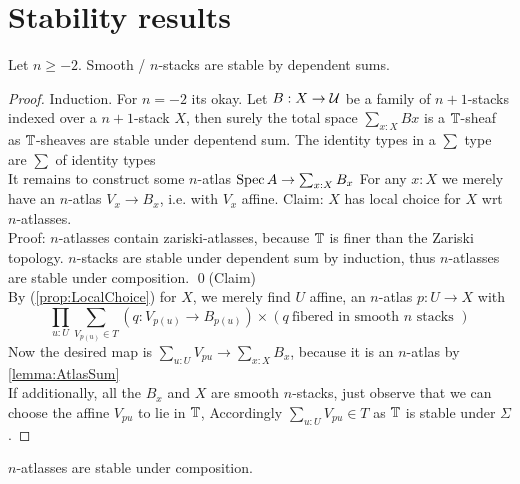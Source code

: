 \documentclass{article}
\begin{document}
\section{Stability results}
\begin{theorem}{\label{thm:stabSums}}
    Let $n \ge -2$. Smooth /  $n$-stacks are stable by dependent sums.
\end{theorem}
\begin{proof}
    Induction.
    For $n = -2$ its okay.    
    Let $B : X \to \mathcal{U}$ be a family of  $n+1$-stacks indexed over a  $n+1$-stack $X$, then surely the total space $\sum_{x : X} B x$ is a $\mathbb{T}$-sheaf as $\mathbb{T}$-sheaves are stable under depentend sum. 
    The identity types in a $\sum$ type are $\sum$ of identity types 
    \\ %
    It remains to construct some $n$-atlas $\operatorname{Spec} A \to \sum_{x : X} B_x$ %
    For any $x : X$ we merely have an $n$-atlas $V_x \to B_x$, i.e. with $V_x$ affine. %
    Claim: $X$ has local choice for $X$ wrt  $n$-atlasses.\\
    Proof:
        $n$-atlasses contain zariski-atlasses, because $\mathbb{T}$ is finer than the Zariski topology.
         $n$-stacks are stable under dependent sum by induction, thus $n$-atlasses are stable under composition.         
    \qed(Claim)\\
    By (\ref{prop:LocalChoice}) for $X$, we merely find $U$ affine, an $n$-atlas $p : U \to X$ %
    with
    \[
    \prod_{u : U} \sum_{V_{p(u)} \in T} (q : V_{p(u)} \to B_{p(u)}) \times (q \ \text{fibered in smooth } n \text{ stacks } )
    \]
    Now the desired map is $\sum_{u : U} V_{p u} \to \sum_{x : X} B_x$, because it is  an $n$-atlas %
    by \ref{lemma:AtlasSum} \\
    If additionally, all the $B_x$ and $X$ are smooth $n$-stacks, just observe that we can choose the affine $V_{p u}$ to lie in $\mathbb{T}$, Accordingly $\sum_{u : U} V_{p u} \in T$ as $\mathbb{T}$ is stable under $\Sigma$.
    
\end{proof}
\begin{corollary}{\label{cor:atlascomp}}
    $n$-atlasses are stable under composition.
\end{corollary}
\end{document}

